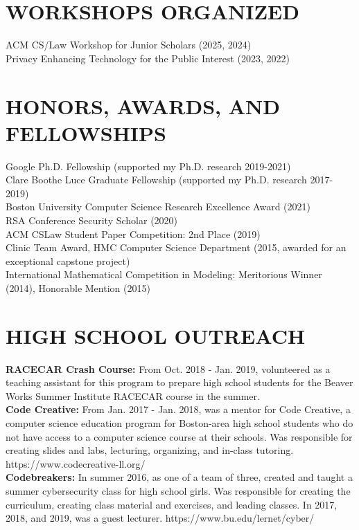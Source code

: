 \documentclass{res}
\begin{document}
\begin{resume}
\section{WORKSHOPS ORGANIZED}
\vspace{0.1in}
ACM CS/Law Workshop for Junior Scholars (2025, 2024) \\
Privacy Enhancing Technology for the Public Interest (2023, 2022)



\section{HONORS, AWARDS, AND FELLOWSHIPS}
\vspace{0.1in}
    Google Ph.D. Fellowship (supported my Ph.D. research 2019-2021) \\
    Clare Boothe Luce Graduate Fellowship (supported my Ph.D. research 2017-2019) \\
    Boston University Computer Science Research Excellence Award (2021) \\
    RSA Conference Security Scholar (2020) \\
    ACM CSLaw Student Paper Competition: 2nd Place (2019) \\
    Clinic Team Award, HMC Computer Science Department (2015, awarded for an exceptional capstone project) \\
    International Mathematical Competition in Modeling: Meritorious Winner (2014), Honorable Mention (2015) \\       



\section{HIGH SCHOOL OUTREACH}
\vspace{0.1in}

\textbf{RACECAR Crash Course:} From Oct. 2018 - Jan. 2019, volunteered as a teaching assistant for
this program to prepare high school students for the Beaver Works Summer Institute RACECAR course in the summer. \\
\textbf{Code Creative:} From Jan. 2017 - Jan. 2018, was a mentor for Code Creative, a computer science education
program for Boston-area high school students who do not have access to a computer science course at their schools.
Was responsible for creating slides and labs, lecturing, organizing, and in-class tutoring.
https://www.codecreative-ll.org/ \\
\textbf{Codebreakers:} In summer 2016, as one of a team of three, created and taught a summer cybersecurity class for
high school girls.  Was responsible for creating the curriculum, creating class material and exercises, and leading
classes.  In 2017, 2018, and 2019, was a guest lecturer.  https://www.bu.edu/lernet/cyber/ \\



\end{resume}
\end{document}
